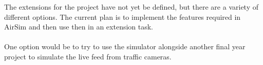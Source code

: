 The extensions for the project have not yet be defined, but there are a variety of different options. The current plan is to implement the features required in AirSim and then use then in an extension task. 
\\~\\
One option would be to try to use the simulator alongside another final year project to simulate the live feed from traffic cameras. 
\\~\\
